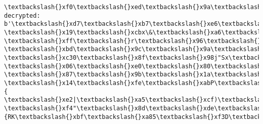 \documentclass[11pt]{article}
\begin{document}
\begin{Verbatim}[commandchars=\\\{\}]
\textbackslash{}xf0\textbackslash{}xed\textbackslash{}x9a\textbackslash{}xbbc\textbackslash{}xbd@\textbackslash{}x86\textbackslash{}x91S\textbackslash{}xd0\textbackslash{}x94=\textbackslash{}xec\textbackslash{}xb7uRM\textbackslash{}x01\textbackslash{}xa7\textbackslash{}xccg\textbackslash{}xdf\textbackslash{}x08\textbackslash{}xe8\textbackslash{}xff
decrypted:
b'\textbackslash{}xd7\textbackslash{}xb7\textbackslash{}xe6\textbackslash{}x9a(i\textbackslash{}xac\textbackslash{}x18\textbackslash{}xd9\textbackslash{}x7f-\textbackslash{}x19\textbackslash{}xcbx\&\textbackslash{}xa6\textbackslash{}t\textbackslash{}xccu\textbackslash{}xc7\textbackslash{}x8f\textbackslash{}xa4p\textbackslash{}x96
\textbackslash{}xff\textbackslash{}r\textbackslash{}x96\textbackslash{}xdaM\textbackslash{}xce\textbackslash{}x13\textbackslash{}x91\textbackslash{}x88\textbackslash{}xb6\textbackslash{}x8e\textbackslash{}xa6\textbackslash{}xec-\textbackslash{}xbd\textbackslash{}x9c\textbackslash{}x9a\textbackslash{}x9f\textbackslash{}xb0o\textbackslash{}xf8SUb
\textbackslash{}xc30\textbackslash{}x8f\textbackslash{}x98j"Sx\textbackslash{}xc4\textbackslash{}x9c\textbackslash{}xae\$\textbackslash{}xe6\textbackslash{}x08\textbackslash{}x9cl\textbackslash{}x17\textbackslash{}xa8\textbackslash{}xe2\textbackslash{}xb6D\textbackslash{}xd4
\textbackslash{}x06\textbackslash{}xe0\textbackslash{}x80\textbackslash{}xda\textbackslash{}xb0\textbackslash{}x18\textbackslash{}xee\textbackslash{}xac\textbackslash{}xa6b\textbackslash{}xaa\textbackslash{}xe5\textbackslash{}xe0\textbackslash{}xa9\textbackslash{}x91\$\&s0\textbackslash{}'U\textbackslash{}xae\textbackslash{}xa1\textbackslash{}x92y
\textbackslash{}x87\textbackslash{}x9b\textbackslash{}x1a\textbackslash{}x9a\$\textbackslash{}xaf\textbackslash{}xa2\}\textbackslash{}xb9\textbackslash{}xa9\textbackslash{}xa3k;\textbackslash{}xa9\textbackslash{}xc5\textbackslash{}x8cU\textbackslash{}xce\textbackslash{}xcd0\textbackslash{}x12\textbackslash{}xa3v
\textbackslash{}x14\textbackslash{}xfe\textbackslash{}xabP\textbackslash{}xa0\textbackslash{}xca\textbackslash{}x9c\textbackslash{}xb4\textbackslash{}x98c\textbackslash{}xdd\textbackslash{}x80\textbackslash{}xc5\textbackslash{}xf6\textbackslash{}x1a\textbackslash{}x87o\textbackslash{}x8a\textbackslash{}xeb3V\{
\textbackslash{}xe2|\textbackslash{}xa5\textbackslash{}xcf)\textbackslash{}x81x\textbackslash{}x1a\textbackslash{}xd79b|\textbackslash{}xe3\textbackslash{}xa7k\textbackslash{}x82\textbackslash{}x83\textbackslash{}xf9\textbackslash{}xdc(I\textbackslash{}xd44@\textbackslash{}xa6J\textbackslash{}xc1
\textbackslash{}xf4"\textbackslash{}x8d\textbackslash{}xde\textbackslash{}xb1\textbackslash{}xd0e\textbackslash{}x98k\textbackslash{}xb4\textbackslash{}xb3\{RK\textbackslash{}xbf\textbackslash{}xa85\textbackslash{}xf3D\textbackslash{}xd2\textbackslash{}x1c!\textbackslash{}xb7\textbackslash{}xcf

\end{Verbatim}
\end{document}
